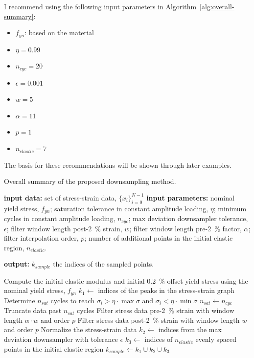 \documentclass[a4paper,11pt]{article}
\begin{document}
I recommend using the following input parameters in Algorithm~\ref{alg:overall-summary}:
\begin{itemize}
    \item $f_{yn}$: based on the material
    \item $\eta = 0.99$
    \item $n_{cyc} = 20$
    \item $\epsilon = 0.001$
    \item $w = 5$
    \item $\alpha = 11$
    \item $p = 1$
    \item $n_{elastic} = 7$
\end{itemize}
The basis for these recommendations will be shown through later examples.

\begin{algorithm}
	\caption{Overall summary of the proposed downsampling method.}
	\label{alg:overall-summary}
	\begin{algorithmic}[1]
        \State \textbf{input data:} set of stress-strain data, $\{x_i\}_{i=0}^{N-1}$
        \State \textbf{input parameters:} nominal yield stress, $f_{yn}$; saturation tolerance in constant amplitude loading, $\eta$; minimum cycles in constant amplitude loading, $n_{cyc}$; max deviation downsampler tolerance, $\epsilon$; filter window length post-2~\% strain, $w$; filter window length pre-2~\% factor, $\alpha$; filter interpolation order, $p$; number of additional points in the initial elastic region, $n_{elastic}$.

        \State \textbf{output:} $k_{sample}$ the indices of the sampled points.
        \bigskip

        \State Compute the initial elastic modulus and initial 0.2~\% offset yield stress using the nominal yield stress, $f_{yn}$
        \State $k_{1} \gets $ indices of the peaks in the stress-strain graph
            \State Determine $n_{sat}$ cycles to reach $\sigma_i > \eta \cdot \max \sigma$ and $\sigma_i < \eta \cdot \min \sigma$
                \State $n_{sat} \gets n_{cyc}$
            \EndIf
            \State Truncate data past $n_{sat}$ cycles
        \EndIf
        \State Filter stress data pre-2~\% strain with window length $\alpha \cdot w$ and order $p$
        \State Filter stress data post-2~\% strain with window length $w$ and order $p$
        \State Normalize the stress-strain data
        \State $k_2 \gets$ indices from the max deviation downsampler with tolerance $\epsilon$
        \State $k_3 \gets$ indices of $n_{elastic}$ evenly spaced points in the initial elastic region
        \State $k_{sample} \gets k_1 \cup k_2 \cup k_3$
    \end{algorithmic}
\end{algorithm}
\end{document}
